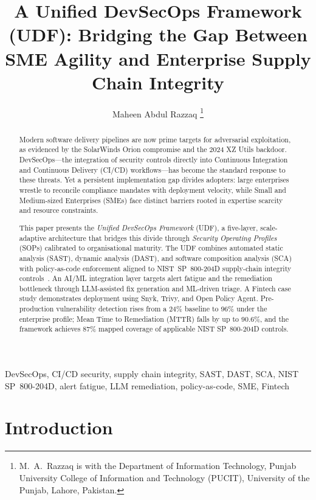 \documentclass[letterpaper, 10pt, conference]{ieeeconf}
\title{\LARGE \bf A Unified DevSecOps Framework (UDF): Bridging
  the Gap Between SME Agility and Enterprise Supply Chain Integrity}
\author{Maheen Abdul Razzaq%
\thanks{M.~A.~Razzaq is with the Department of Information Technology,
Punjab University College of Information and Technology (PUCIT),
University of the Punjab, Lahore, Pakistan.}%
}
\begin{document}
\maketitle
\thispagestyle{empty}
\pagestyle{empty}

\begin{abstract}
Modern software delivery pipelines are now prime targets for adversarial
exploitation, as evidenced by the SolarWinds Orion compromise and the
2024 XZ Utils backdoor. DevSecOps---the integration of security controls
directly into Continuous Integration and Continuous Delivery (CI/CD)
workflows---has become the standard response to these threats. Yet a
persistent implementation gap divides adopters: large enterprises wrestle
to reconcile compliance mandates with deployment velocity, while Small and
Medium-sized Enterprises (SMEs) face distinct barriers rooted in expertise
scarcity and resource constraints.

This paper presents the \emph{Unified DevSecOps Framework} (UDF), a
five-layer, scale-adaptive architecture that bridges this divide through
\emph{Security Operating Profiles} (SOPs) calibrated to organisational
maturity. The UDF combines automated static analysis (SAST), dynamic
analysis (DAST), and software composition analysis (SCA) with
policy-as-code enforcement aligned to NIST~SP~800-204D supply-chain
integrity controls~\cite{nist2024}. An AI/ML integration layer targets
alert fatigue and the remediation bottleneck through LLM-assisted fix
generation and ML-driven triage. A Fintech case study demonstrates
deployment using Snyk, Trivy, and Open Policy Agent. Pre-production
vulnerability detection rises from a 24\% baseline to 96\% under the
enterprise profile; Mean Time to Remediation (MTTR) falls by up to
90.6\%, and the framework achieves 87\% mapped coverage of applicable
NIST SP~800-204D controls.
\end{abstract}

\begin{IEEEkeywords}
DevSecOps, CI/CD security, supply chain integrity, SAST, DAST, SCA,
NIST SP~800-204D, alert fatigue, LLM remediation, policy-as-code,
SME, Fintech
\end{IEEEkeywords}

\section{Introduction}
\end{document}
